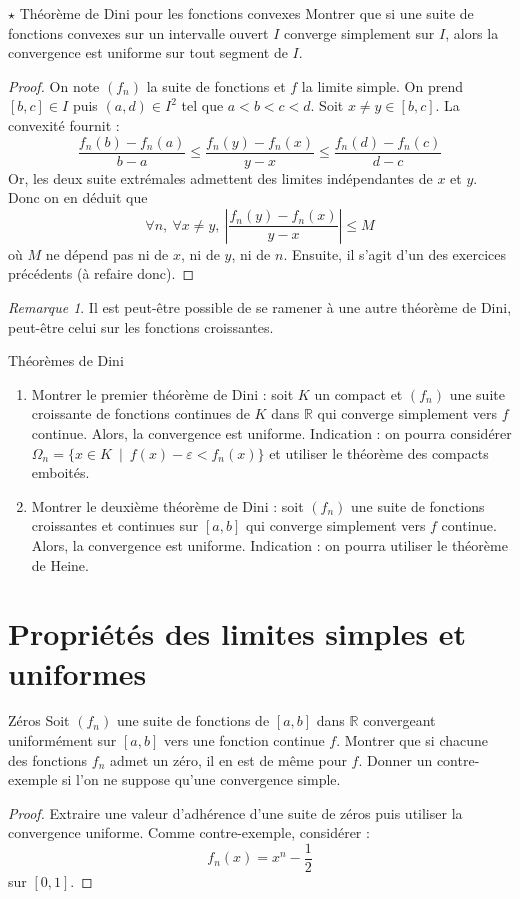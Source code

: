 \documentclass[french,a4paper]{article}
\newcommand{\R}{\mathbb{R}}
\theoremstyle{plain}
\theoremstyle{definition}
\theoremstyle{remark}
\newtheorem*{rmq}{Remarque}
\begin{document}
\begin{ex}{$\star$ Théorème de Dini pour les fonctions convexes}
	Montrer que si une suite de fonctions convexes sur un intervalle ouvert $I$ converge simplement sur $I$, alors la convergence est uniforme sur tout segment de $I$.
\end{ex}
\begin{proof}
	On note $(f_n)$ la suite de fonctions et $f$ la limite simple. On prend $[b,c]\in I$ puis $(a,d)\in I^2$ tel que $a<b<c<d$. Soit $x\ne y\in[b,c]$. La convexité fournit : $$\frac{f_n(b)-f_n(a)}{b-a}\leqslant\frac{f_n(y)-f_n(x)}{y-x}\leqslant\frac{f_n(d)-f_n(c)}{d-c}$$ Or, les deux suite extrémales admettent des limites indépendantes de $x$ et $y$. Donc on en déduit que $$\forall n,\ \forall x\ne y,\ \left\lvert \frac{f_n(y)-f_n(x)}{y-x}\right\rvert\leqslant M$$ où $M$ ne dépend pas ni de $x$, ni de $y$, ni de $n$. Ensuite, il s'agit d'un des exercices précédents (à refaire donc).
\end{proof}
\begin{rmq}
	Il est peut-être possible de se ramener à une autre théorème de Dini, peut-être celui sur les fonctions croissantes.
\end{rmq}

\begin{ex}[Châteaux]{Théorèmes de Dini}
	\begin{enumerate}
		\item Montrer le premier théorème de Dini : soit $K$ un compact et $(f_n)$ une suite croissante de fonctions continues de $K$ dans $\R$ qui converge simplement vers $f$ continue. Alors, la convergence est uniforme. Indication : on pourra considérer $\Omega_n=\{x\in K\ \mid\ f(x)-\varepsilon< f_n(x)\}$ et utiliser le théorème des compacts emboités.
		\item Montrer le deuxième théorème de Dini : soit $(f_n)$ une suite de fonctions croissantes et continues sur $[a,b]$ qui converge simplement vers $f$ continue. Alors, la convergence est uniforme. Indication : on pourra utiliser le théorème de Heine.
	\end{enumerate}
\end{ex}

\section{Propriétés des limites simples et uniformes}

\begin{ex}{Zéros}
	Soit $(f_n)$ une suite de fonctions de $[a,b]$ dans $\R$ convergeant uniformément sur $[a,b]$ vers une fonction continue $f$. Montrer que si chacune des fonctions $f_n$ admet un zéro, il en est de même pour $f$. Donner un contre-exemple si l'on ne suppose qu'une convergence simple.
\end{ex}
\begin{proof}
	Extraire une valeur d'adhérence d'une suite de zéros puis utiliser la convergence uniforme. Comme contre-exemple, considérer : $$f_n(x)=x^n-\frac{1}{2}$$ sur $[0,1]$.
\end{proof}
\end{document}
